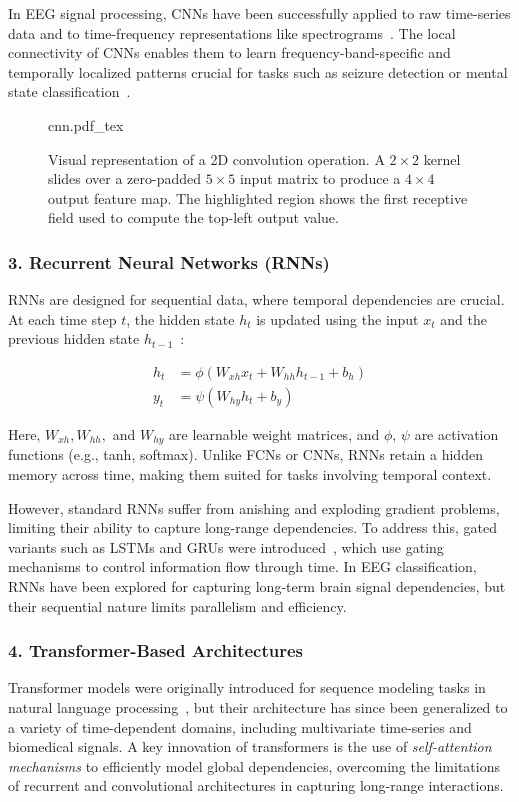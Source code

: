 In EEG signal processing, CNNs have been successfully applied to raw time-series data and to time-frequency representations like spectrograms~\cite{lawhern2018eegnet}. The local connectivity of CNNs enables them to learn frequency-band-specific and temporally localized patterns crucial for tasks such as seizure detection or mental state classification~\cite{lawhern2018eegnet}.
\begin{figure}[h!]
	\centering
        \def\svgwidth{400pt}
 	{cnn.pdf_tex} 	  	 	
	\caption[Visual representation of a 2D convolution operation]{Visual representation of a 2D convolution operation. A $2 \times 2$ kernel slides over a zero-padded $5 \times 5$ input matrix to produce a $4 \times 4$ output feature map. The highlighted region shows the first receptive field used to compute the top-left output value.}
	\label{fig:CNN}
\end{figure}
\subsubsection{3. Recurrent Neural Networks (RNNs)}
RNNs are designed for sequential data, where temporal dependencies are crucial. At each time step $t$, the hidden state $h_t$ is updated using the input $x_t$ and the previous hidden state $h_{t-1}$~\cite{roy2019chrononet}:

\begin{align}
h_t &= \phi(W_{xh}x_t + W_{hh}h_{t-1} + b_h) \\
y_t &= \psi(W_{hy}h_t + b_y)
\end{align}

Here, $W_{xh}, W_{hh},$ and $W_{hy}$ are learnable weight matrices, and $\phi$, $\psi$ are activation functions (e.g., tanh, softmax). Unlike FCNs or CNNs, RNNs retain a hidden memory across time, making them suited for tasks involving temporal context.

However, standard RNNs suffer from anishing and exploding gradient problems, limiting their ability to capture long-range dependencies. To address this, gated variants such as LSTMs and GRUs were introduced~\cite{hochreiter1997long, cho2014learning}, which use gating mechanisms to control information flow through time. In EEG classification, RNNs have been explored for capturing long-term brain signal dependencies, but their sequential nature limits parallelism and efficiency.

\subsubsection{4. Transformer-Based Architectures}
Transformer models were originally introduced for sequence modeling tasks in natural language processing~\cite{vaswani2017attention}, but their architecture has since been generalized to a variety of time-dependent domains, including multivariate time-series and biomedical signals. A key innovation of transformers is the use of \textit{self-attention mechanisms} to efficiently model global dependencies, overcoming the limitations of recurrent and convolutional architectures in capturing long-range interactions.

